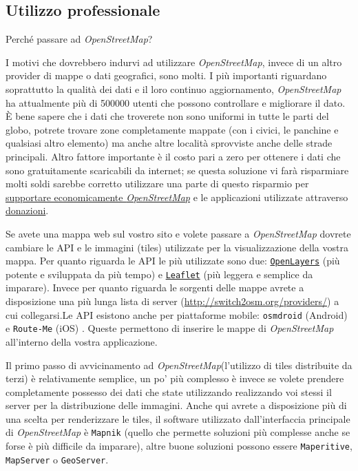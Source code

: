\documentclass[a4paper,twoside,12pt,]{article}
\newcommand{\osm}{\emph{OpenStreetMap}\xspace}
\newcommand{\soft}[1]{\texttt{#1}}
\begin{document}
\subsection{Utilizzo professionale}
Perché passare ad \osm? 

I motivi che dovrebbero indurvi ad utilizzare \osm, invece di un altro provider di mappe o dati geografici, sono molti. I più importanti riguardano soprattutto la qualità dei dati e il loro continuo aggiornamento, \osm ha attualmente più di 500000 utenti che possono controllare e migliorare il dato. È bene sapere che i dati che troverete non sono uniformi in tutte le parti del globo, potrete trovare zone completamente mappate (con i civici, le panchine e qualsiasi altro elemento) ma anche altre località sprovviste anche delle strade principali. Altro fattore importante è il costo pari a zero per ottenere i dati che sono gratuitamente scaricabili da internet; se questa soluzione vi farà risparmiare molti soldi sarebbe corretto utilizzare una parte di questo risparmio per \href{http://donate.openstreetmap.org/}{supportare economicamente \osm} e le applicazioni utilizzate attraverso \href{http://www.gfoss.it/drupal/donazioni}{donazioni}.

Se avete una mappa web sul vostro sito e volete passare a \osm dovrete cambiare le API e le immagini (tiles) utilizzate per la visualizzazione della vostra mappa. Per quanto riguarda le API le più utilizzate sono due: \soft{\href{http://openlayers.org}{OpenLayers}} (più potente e sviluppata da più tempo) e \soft{\href{http://leaflet.cloudmade.com/}{Leaflet}} (più leggera e semplice da imparare). Invece per quanto riguarda le sorgenti delle mappe avrete a disposizione una più lunga lista di server (\url{http://switch2osm.org/providers/}) a cui collegarsi.\newline Le API esistono anche per piattaforme mobile:  \soft{osmdroid} (Android) e \soft{Route-Me} (iOS) . Queste permettono di inserire le mappe di \osm all'interno della vostra applicazione.

Il primo passo di avvicinamento ad \osm (l'utilizzo di tiles distribuite da terzi) è relativamente semplice, un po' più complesso è invece se volete prendere completamente possesso dei dati che state utilizzando realizzando voi stessi il server per la distribuzione delle immagini. Anche qui avrete a disposizione più di una scelta per renderizzare le tiles, il software utilizzato dall'interfaccia principale di \osm è \soft{Mapnik} (quello che permette soluzioni più complesse anche se forse è più difficile da imparare), altre buone soluzioni possono essere \soft{Maperitive}, \soft{MapServer} o \soft{GeoServer}.
\end{document}
